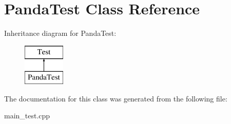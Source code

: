 \hypertarget{class_panda_test}{}\section{Panda\+Test Class Reference}
\label{class_panda_test}
Inheritance diagram for Panda\+Test\+:\begin{figure}[H]
\begin{center}
\leavevmode
\includegraphics[height=2.000000cm]{class_panda_test}
\end{center}
\end{figure}


The documentation for this class was generated from the following file\+:\begin{DoxyCompactItemize}
\item 
main\+\_\+test.\+cpp\end{DoxyCompactItemize}
